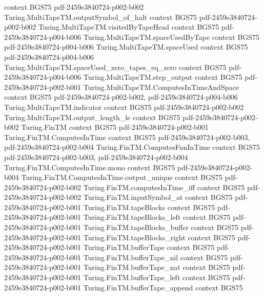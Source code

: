 \begin{theorem}
  {context}
  {BGS75}
  {pdf-2459e3840724-p002-b002}
\proofstep
  {Turing.MultiTapeTM.outputSymbol_of_halt}
  {context}
  {BGS75}
  {pdf-2459e3840724-p002-b002}
\proofstep
  {Turing.MultiTapeTM.visitedByTapeHead}
  {context}
  {BGS75}
  {pdf-2459e3840724-p004-b006}
\proofstep
  {Turing.MultiTapeTM.spaceUsedByTape}
  {context}
  {BGS75}
  {pdf-2459e3840724-p004-b006}
\proofstep
  {Turing.MultiTapeTM.spaceUsed}
  {context}
  {BGS75}
  {pdf-2459e3840724-p004-b006}
\proofstep
  {Turing.MultiTapeTM.spaceUsed_zero_tapes_eq_zero}
  {context}
  {BGS75}
  {pdf-2459e3840724-p004-b006}
\proofstep
  {Turing.MultiTapeTM.step_output}
  {context}
  {BGS75}
  {pdf-2459e3840724-p002-b001}
\proofstep
  {Turing.MultiTapeTM.ComputesInTimeAndSpace}
  {context}
  {BGS75}
  {pdf-2459e3840724-p002-b002,
    pdf-2459e3840724-p004-b006}
\proofstep
  {Turing.MultiTapeTM.indicator}
  {context}
  {BGS75}
  {pdf-2459e3840724-p002-b002}
\proofstep
  {Turing.MultiTapeTM.output_length_le}
  {context}
  {BGS75}
  {pdf-2459e3840724-p002-b002}
\proofstep
  {Turing.FinTM}
  {context}
  {BGS75}
  {pdf-2459e3840724-p002-b001}
\proofstep
  {Turing.FinTM.ComputesInTime}
  {context}
  {BGS75}
  {pdf-2459e3840724-p002-b003,
    pdf-2459e3840724-p002-b004}
\proofstep
  {Turing.FinTM.ComputesFunInTime}
  {context}
  {BGS75}
  {pdf-2459e3840724-p002-b003,
    pdf-2459e3840724-p002-b004}
\proofstep
  {Turing.FinTM.ComputesInTime.mono}
  {context}
  {BGS75}
  {pdf-2459e3840724-p002-b004}
\proofstep
  {Turing.FinTM.ComputesInTime.output_unique}
  {context}
  {BGS75}
  {pdf-2459e3840724-p002-b002}
\proofstep
  {Turing.FinTM.computesInTime_iff}
  {context}
  {BGS75}
  {pdf-2459e3840724-p002-b002}
\proofstep
  {Turing.FinTM.inputSymbol_at}
  {context}
  {BGS75}
  {pdf-2459e3840724-p002-b001}
\proofstep
  {Turing.FinTM.tapeBlocks}
  {context}
  {BGS75}
  {pdf-2459e3840724-p002-b001}
\proofstep
  {Turing.FinTM.tapeBlocks_left}
  {context}
  {BGS75}
  {pdf-2459e3840724-p002-b001}
\proofstep
  {Turing.FinTM.tapeBlocks_buffer}
  {context}
  {BGS75}
  {pdf-2459e3840724-p002-b001}
\proofstep
  {Turing.FinTM.tapeBlocks_right}
  {context}
  {BGS75}
  {pdf-2459e3840724-p002-b001}
\proofstep
  {Turing.FinTM.bufferTape}
  {context}
  {BGS75}
  {pdf-2459e3840724-p002-b001}
\proofstep
  {Turing.FinTM.bufferTape_nil}
  {context}
  {BGS75}
  {pdf-2459e3840724-p002-b001}
\proofstep
  {Turing.FinTM.bufferTape_nat}
  {context}
  {BGS75}
  {pdf-2459e3840724-p002-b001}
\proofstep
  {Turing.FinTM.bufferTape_left}
  {context}
  {BGS75}
  {pdf-2459e3840724-p002-b001}
\proofstep
  {Turing.FinTM.bufferTape_append}
  {context}
  {BGS75}

\end{theorem}
